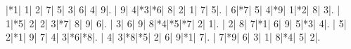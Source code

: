 \documentclass{cons-beamer}
\begin{document}
\begin{frame}[fragile]
  \begin{center}
    \vspace{2mm}
    \PuzzleUnitlength=11pt
    \renewcommand*\SudokuLinethickness{1pt}
    \renewcommand*\PuzzleFont{\sf\tiny}
    \begin{Sudoku}
      |*1| 1| 2| 7| 5| 3| 6| 4| 9|.
      | 9| 4|*3|*6| 8| 2| 1| 7| 5|.
      | 6|*7| 5| 4|*9| 1|*2| 8| 3|.
      | 1|*5| 2| 2| 3|*7| 8| 9| 6|.
      | 3| 6| 9| 8|*4|*5|*7| 2| 1|.
      | 2| 8| 7|*1| 6| 9| 5|*3| 4|.
      | 5| 2|*1| 9| 7| 4| 3|*6|*8|.
      | 4| 3|*8|*5| 2| 6| 9|*1| 7|.
      | 7|*9| 6| 3| 1| 8|*4| 5| 2|.
    \end{Sudoku}
  \end{center}

    

\end{frame}
\end{document}
